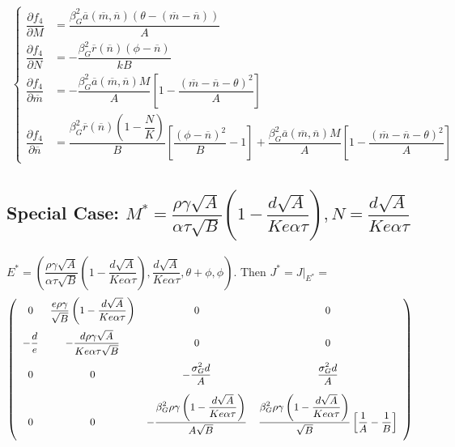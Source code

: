 \documentclass[12pt]{article}
\begin{document}
\begin{align*}
\begin{cases}
		\dfrac{\partial f_4}{\partial M} &= \dfrac{\beta_G^2\overline{a}(\overline{m},\overline{n})(\theta-(\overline{m}-\overline{n}))}{A} \\[.25cm]
		\dfrac{\partial f_4}{\partial N} &= - \dfrac{\beta_G^2\overline{r}(\overline{n})(\phi - \overline{n})}{kB} \\[.25cm]
		\dfrac{\partial f_4}{\partial \overline{m}} &= - \dfrac{\beta_G^2\overline{a}(\overline{m},\overline{n})M}{A} \left[{1 - \dfrac{(\overline{m}-\overline{n}-\theta)^2}{A}}\right] \\[.25cm]
		\dfrac{\partial f_4}{\partial \overline{n}} &= \dfrac{\beta_G^2\overline{r}(\overline{n})\left({1-\dfrac{N}{K}}\right)}{B}\left[{\dfrac{(\phi-\overline{n})^2}{B}-1}\right] + \dfrac{\beta_G^2\overline{a}(\overline{m},\overline{n})M}{A}\left[{1-\dfrac{(\overline{m}-\overline{n}-\theta)^2}{A}}\right]
	\end{cases}
\end{align*}


\subsection*{Special Case: $M^*=\dfrac{\rho\gamma\sqrt{A}}{\alpha\tau\sqrt{B}}\left({1-\dfrac{d\sqrt{A}}{Ke\alpha\tau}}\right), N=\dfrac{d\sqrt{A}}{Ke\alpha\tau}$}
$E^* = (\dfrac{\rho\gamma\sqrt{A}}{\alpha\tau\sqrt{B}}\left({1-\dfrac{d\sqrt{A}}{Ke\alpha\tau}}\right), \dfrac{d\sqrt{A}}{Ke\alpha\tau}, \theta+\phi, \phi)$. Then $ J^* = J\big|_{E^*} = $
\begin{align*}
\begin{small}
	\left(
	\begin{array}{cccc}
		0 & \dfrac{e\rho\gamma}{\sqrt{B}}\left({1-\dfrac{d\sqrt{A}}{Ke\alpha\tau}}\right) & 0 & 0 \\[.4cm]
		-\dfrac{d}{e} & -\dfrac{d\rho\gamma\sqrt{A}}{Ke\alpha\tau\sqrt{B}} & 0 & 0 \\[0.4cm]
		0 & 0 & -\dfrac{\sigma_G^2d}{A} & \dfrac{\sigma_G^2d}{A} \\[0.4cm]
		0 & 0 & -\dfrac{\beta_G^2\rho\gamma\left({1-\dfrac{d\sqrt{A}}{Ke\alpha\tau}}\right)}{A\sqrt{B}} & \dfrac{\beta_G^2\rho\gamma\left({1-\dfrac{d\sqrt{A}}{Ke\alpha\tau}}\right)}{\sqrt{B}}\left[{\dfrac{1}{A}-\dfrac{1}{B}}\right] \\[0.4cm]
	\end{array}
	\right)
\end{small}
\end{align*}
\end{document}
